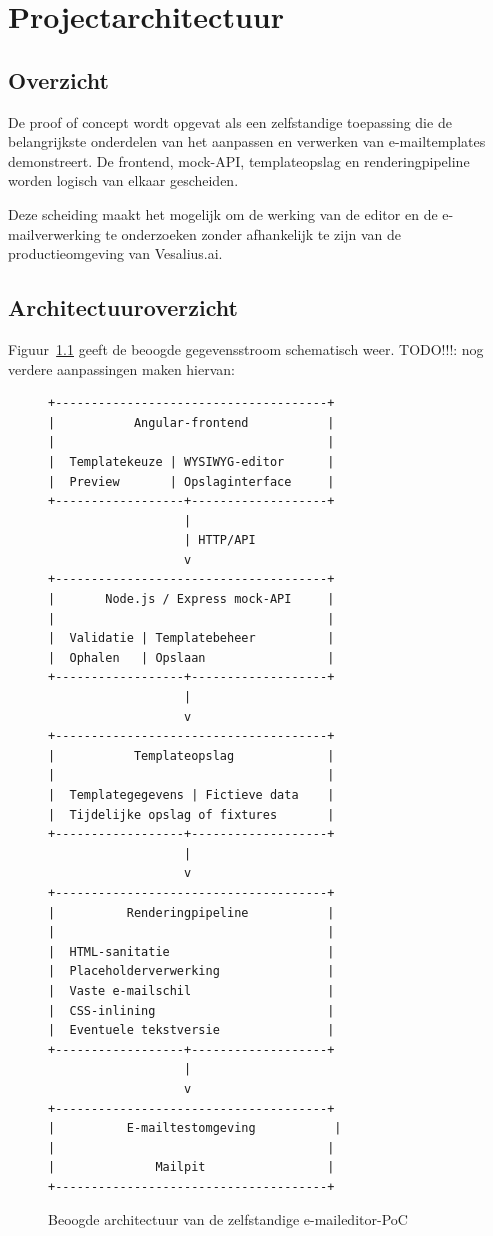 \chapter{Projectarchitectuur}
\label{app:projectarchitectuur}

\section{Overzicht}
De proof of concept wordt opgevat als een zelfstandige toepassing die
de belangrijkste onderdelen van het aanpassen en verwerken van e-mailtemplates
demonstreert. De frontend, mock-API, templateopslag en renderingpipeline
worden logisch van elkaar gescheiden.

Deze scheiding maakt het mogelijk om de werking van de editor en de
e-mailverwerking te onderzoeken zonder afhankelijk te zijn van de
productieomgeving van Vesalius.ai.

\section{Architectuuroverzicht}

Figuur~\ref{fig:architectuur-overzicht} geeft de beoogde gegevensstroom
schematisch weer.
TODO!!!: nog verdere aanpassingen maken hiervan:
\begin{figure}[htbp]
    \centering
    \begin{verbatim}
+--------------------------------------+
|           Angular-frontend           |
|                                      |
|  Templatekeuze | WYSIWYG-editor      |
|  Preview       | Opslaginterface     |
+------------------+-------------------+
                   |
                   | HTTP/API
                   v
+--------------------------------------+
|       Node.js / Express mock-API     |
|                                      |
|  Validatie | Templatebeheer          |
|  Ophalen   | Opslaan                 |
+------------------+-------------------+
                   |
                   v
+--------------------------------------+
|           Templateopslag             |
|                                      |
|  Templategegevens | Fictieve data    |
|  Tijdelijke opslag of fixtures       |
+------------------+-------------------+
                   |
                   v
+--------------------------------------+
|          Renderingpipeline           |
|                                      |
|  HTML-sanitatie                      |
|  Placeholderverwerking               |
|  Vaste e-mailschil                   |
|  CSS-inlining                        |
|  Eventuele tekstversie               |
+------------------+-------------------+
                   |
                   v
+--------------------------------------+
|          E-mailtestomgeving           |
|                                      |
|              Mailpit                 |
+--------------------------------------+
    \end{verbatim}
    \caption{Beoogde architectuur van de zelfstandige e-maileditor-PoC}
    \label{fig:architectuur-overzicht}
\end{figure}


